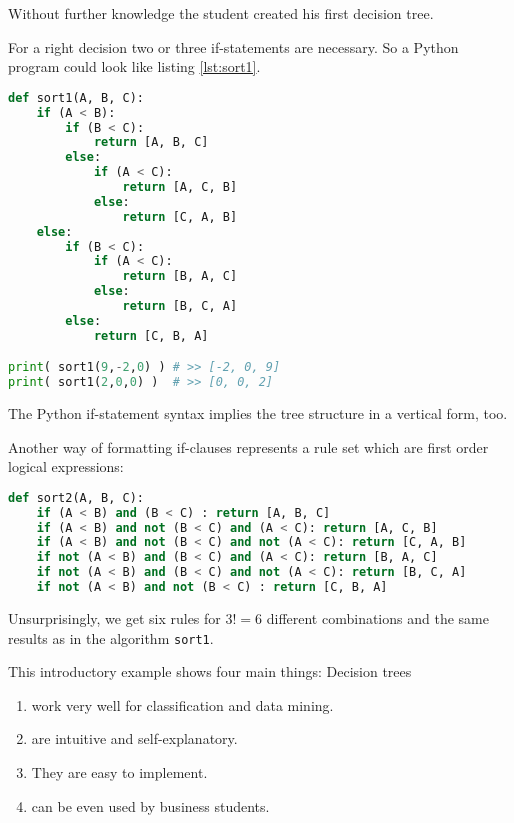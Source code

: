 Without further knowledge the student created his first decision tree.

For a right decision two or three if-statements are necessary. So a Python program could look like listing \ref{lst:sort1}.

\newpage

\begin{lstlisting}[style = siemens, language = Python, caption={[A Python implementation of a decision tree for sorting three elements]A Python implementation of a decision tree for sorting three elements $A, B, C$},label=lst:sort1]
def sort1(A, B, C):
	if (A < B):
		if (B < C):
			return [A, B, C]
		else:
			if (A < C):
				return [A, C, B]
			else:
				return [C, A, B]
	else:
		if (B < C):
			if (A < C):
				return [B, A, C]
			else:
				return [B, C, A]
		else:
			return [C, B, A]

print( sort1(9,-2,0) ) # >> [-2, 0, 9]
print( sort1(2,0,0) )  # >> [0, 0, 2]
\end{lstlisting}

\begin{remark}
    The Python if-statement syntax implies the tree structure in a vertical form, too.      
\end{remark}

Another way of formatting if-clauses represents a rule set which are first order logical expressions:  
    \begin{lstlisting}[style = siemens, language = Python, caption={A Python reimplementation of the decision tree given in listing \ref{lst:sort1} as a set of first order logical rules},label=lst:sort2]
def sort2(A, B, C):
	if (A < B) and (B < C) : return [A, B, C]
	if (A < B) and not (B < C) and (A < C): return [A, C, B]
	if (A < B) and not (B < C) and not (A < C): return [C, A, B]
	if not (A < B) and (B < C) and (A < C): return [B, A, C]
	if not (A < B) and (B < C) and not (A < C): return [B, C, A]
	if not (A < B) and not (B < C) : return [C, B, A]
\end{lstlisting}

Unsurprisingly, we get six rules for $3! = 6$ different combinations and the same results as in the algorithm \texttt{sort1}. 


This introductory example shows four main things: Decision trees
\begin{enumerate}
    \item work very well for classification and data mining.
    \item are intuitive and self-explanatory.
    \item They are easy to implement.
    \item can be even used by business students.
\end{enumerate}

